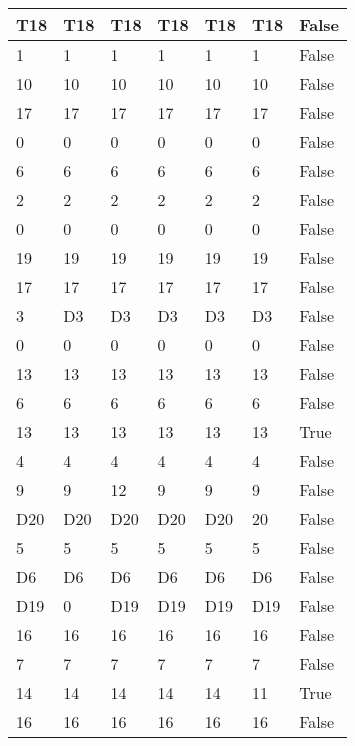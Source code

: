 \begin{longtable}[htbp]{| p{} | p{} | p{}| p{}| p{}| p{}| p{}|}
\multicolumn{1}{|l|}{T18} & \multicolumn{1}{l|}{T18} & \multicolumn{1}{l|}{T18} & \multicolumn{1}{l|}{T18} & \multicolumn{1}{l|}{T18} & \multicolumn{1}{l|}{T18} & False \\ \hline
1 & 1 & 1 & 1 & 1 & 1 & False \\ \hline
10 & 10 & 10 & 10 & 10 & 10 & False \\ \hline
17 & 17 & 17 & 17 & 17 & 17 & False \\ \hline
0 & 0 & 0 & 0 & 0 & 0 & False \\ \hline
6 & 6 & 6 & 6 & 6 & 6 & False \\ \hline
2 & 2 & 2 & 2 & 2 & 2 & False \\ \hline
0 & 0 & 0 & 0 & 0 & 0 & False \\ \hline
19 & 19 & 19 & 19 & 19 & 19 & False \\ \hline
17 & 17 & 17 & 17 & 17 & 17 & False \\ \hline
3 & \multicolumn{1}{l|}{D3} & \multicolumn{1}{l|}{D3} & \multicolumn{1}{l|}{D3} & \multicolumn{1}{l|}{D3} & \multicolumn{1}{l|}{D3} & False \\ \hline
0 & 0 & 0 & 0 & 0 & 0 & False \\ \hline
13 & 13 & 13 & 13 & 13 & 13 & False \\ \hline
6 & 6 & 6 & 6 & 6 & 6 & False \\ \hline
13 & 13 & 13 & 13 & 13 & 13 & True \\ \hline
4 & 4 & 4 & 4 & 4 & 4 & False \\ \hline
9 & 9 & 12 & 9 & 9 & 9 & False \\ \hline
\multicolumn{1}{|l|}{D20} & \multicolumn{1}{l|}{D20} & \multicolumn{1}{l|}{D20} & \multicolumn{1}{l|}{D20} & \multicolumn{1}{l|}{D20} & 20 & False \\ \hline
5 & 5 & 5 & 5 & 5 & 5 & False \\ \hline
\multicolumn{1}{|l|}{D6} & \multicolumn{1}{l|}{D6} & \multicolumn{1}{l|}{D6} & \multicolumn{1}{l|}{D6} & \multicolumn{1}{l|}{D6} & \multicolumn{1}{l|}{D6} & False \\ \hline
\multicolumn{1}{|l|}{D19} & 0 & \multicolumn{1}{l|}{D19} & \multicolumn{1}{l|}{D19} & \multicolumn{1}{l|}{D19} & \multicolumn{1}{l|}{D19} & False \\ \hline
16 & 16 & 16 & 16 & 16 & 16 & False \\ \hline
7 & 7 & 7 & 7 & 7 & 7 & False \\ \hline
14 & 14 & 14 & 14 & 14 & 11 & True \\ \hline
16 & 16 & 16 & 16 & 16 & 16 & False \\ \hline

\end{longtable}

